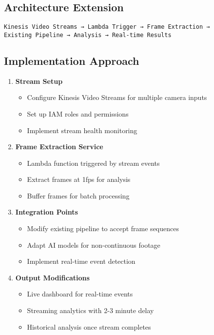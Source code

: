 \documentclass[11pt,a4paper]{article}
\begin{document}
\subsection{Architecture Extension}
\begin{center}
\texttt{Kinesis Video Streams → Lambda Trigger → Frame Extraction →\\
Existing Pipeline → Analysis → Real-time Results}
\end{center}

\subsection{Implementation Approach}
\begin{enumerate}[leftmargin=1.5cm]
    \item \textbf{Stream Setup}
    \begin{itemize}
        \item Configure Kinesis Video Streams for multiple camera inputs
        \item Set up IAM roles and permissions
        \item Implement stream health monitoring
    \end{itemize}
    
    \item \textbf{Frame Extraction Service}
    \begin{itemize}
        \item Lambda function triggered by stream events
        \item Extract frames at 1fps for analysis
        \item Buffer frames for batch processing
    \end{itemize}
    
    \item \textbf{Integration Points}
    \begin{itemize}
        \item Modify existing pipeline to accept frame sequences
        \item Adapt AI models for non-continuous footage
        \item Implement real-time event detection
    \end{itemize}
    
    \item \textbf{Output Modifications}
    \begin{itemize}
        \item Live dashboard for real-time events
        \item Streaming analytics with 2-3 minute delay
        \item Historical analysis once stream completes
    \end{itemize}
\end{enumerate}
\end{document}
